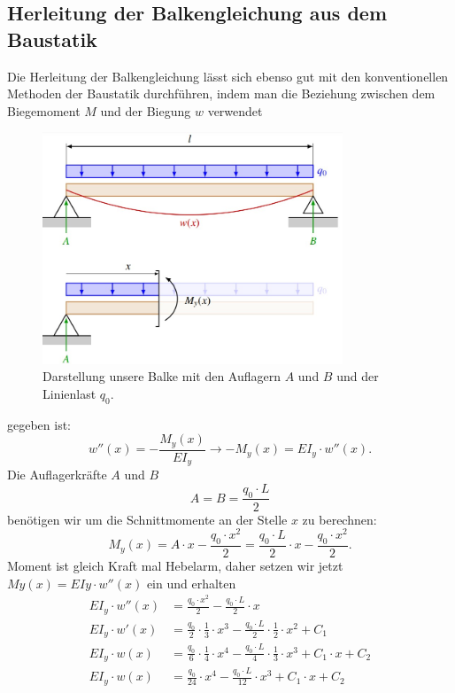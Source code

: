 \subsection{Herleitung der Balkengleichung aus dem Baustatik}
Die Herleitung der Balkengleichung lässt sich ebenso gut mit den konventionellen Methoden der Baustatik durchführen, indem man die Beziehung zwischen dem Biegemoment $M$ und der Biegung $w$ verwendet
\begin{figure}
\begin{center}
	\includegraphics[width=0.8\textwidth]{papers/balken/images/teil2/HerleitungBaustatik.jpg}
\end{center}
\caption{Darstellung unsere Balke mit den Auflagern $A$ und $B$ und der Linienlast $q_0$.}
\end{figure}
gegeben ist:
\begin{equation}
	w''(x)=
	-\frac{M_y(x)}{EI_y}
	\rightarrow-M_y(x)=
	EI_y\cdot w''(x).
\end{equation}
Die Auflagerkräfte $A$ und $B$
\begin{equation}
	A=
	B=
	\frac{q_0\cdot L}{2}
\end{equation}
benötigen wir um die Schnittmomente an der Stelle $x$ zu berechnen:
\begin{equation}
	M_y(x)=
	A\cdot x-\frac{q_0\cdot x^2}{2}=
	\frac{q_0\cdot L}{2}\cdot x-\frac{q_0\cdot x^2}{2}.
\end{equation}
Moment ist gleich Kraft mal Hebelarm, daher setzen wir jetzt $My(x) = EIy \cdot w''(x)$ ein und erhalten
\begin{align}
		EI_y\cdot w''(x)&=
		\frac{q_0\cdot x^2}{2}-\frac{q_0\cdot L}{2}\cdot x
	\\
		EI_y\cdot w'\left(x\right)&=
		\frac{q_0}{2}\cdot\frac{1}{3}\cdot x^3-\frac{q_0\cdot 	L}{2}\cdot\frac{1}{2}\cdot x^2+C_1
	\\
		EI_y\cdot w\left(x\right)&=
		\frac{q_0}{6}\cdot\frac{1}{4}\cdot x^4-\frac{q_0\cdot 	L}{4}\cdot\frac{1}{3}\cdot x^3+C_1\cdot x+C_2
	\\
		EI_y\cdot w\left(x\right)&=
		\frac{q_0}{24}\cdot x^4-\frac{q_0\cdot L}{12}\cdot x^3+C_1\cdot x+C_2
\end{align}


